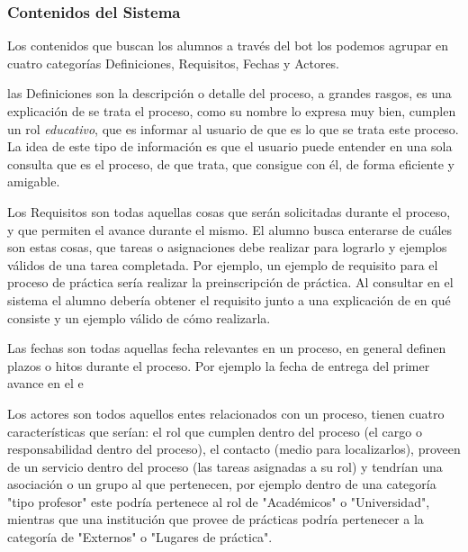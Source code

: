     \subsubsection{Contenidos del Sistema}
    \label{sssec:contenidos}
    \par Los contenidos que buscan los alumnos a través del bot los podemos agrupar en cuatro categorías Definiciones, Requisitos, Fechas y Actores.
    \par las Definiciones son la descripción o detalle del proceso, a grandes rasgos, es una explicación de se trata el proceso, como su nombre lo expresa muy bien, cumplen un rol \textit{educativo}, que es informar al usuario de que es lo que se trata este proceso. La idea de este tipo de información es que el usuario puede entender en una sola consulta que es el proceso, de que trata, que consigue con él, de forma eficiente y amigable.
    \par Los Requisitos son todas aquellas cosas que serán solicitadas durante el proceso, y que permiten el avance durante el mismo. El alumno busca enterarse de cuáles son estas cosas, que tareas o asignaciones debe realizar para lograrlo y ejemplos válidos de una tarea completada. Por ejemplo, un ejemplo de requisito para el proceso de práctica sería realizar la preinscripción de práctica. Al consultar en el sistema el alumno debería obtener el requisito junto a una explicación de en qué consiste y un ejemplo válido de cómo realizarla.
    \par Las fechas son todas aquellas fecha relevantes en un proceso, en general definen plazos o hitos durante el proceso. Por ejemplo la fecha de entrega del primer avance en el \acrshort{e}
    \par Los actores son todos aquellos entes relacionados con un proceso, tienen cuatro características que serían: el rol que cumplen dentro del proceso (el cargo o responsabilidad dentro del proceso), el contacto (medio para localizarlos), proveen de un servicio dentro del proceso (las tareas asignadas a su rol) y tendrían una asociación o un grupo al que pertenecen, por ejemplo dentro de una categoría "tipo profesor" este podría pertenece al rol de "Académicos" o "Universidad", mientras que una institución que provee de prácticas podría pertenecer a la categoría de "Externos" o "Lugares de práctica".
